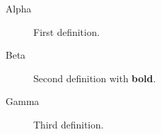 \begin{description}
\item[Alpha] First definition.
\item[Beta] Second definition with \textbf{bold}.
\item[Gamma] Third definition.
\end{description}
